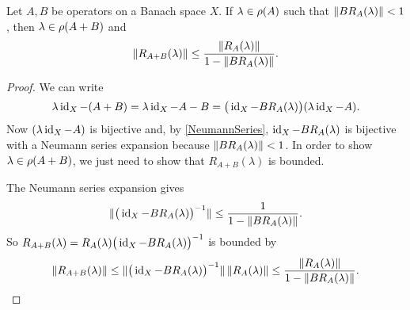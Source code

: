 \begin{lemma} \label{perturbationLemma}
Let $A, B$ be operators on a Banach space $X$. If $\lambda\in\rho(A)$ such that $\lVert BR_A(\lambda)\rVert < 1$, then $\lambda\in \rho(A+B)$ and
\[ \lVert R_{A+B}(\lambda)\rVert \leq \frac{\lVert R_A(\lambda)\rVert}{1- \lVert BR_A(\lambda)\rVert}. \]
\end{lemma}
\begin{proof}
We can write
\[ \lambda\operatorname{id}_X - (A+B) = \lambda\operatorname{id}_X - A-B = \big(\operatorname{id}_X - BR_A(\lambda)\big)(\lambda\operatorname{id}_X - A). \]
Now $(\lambda\operatorname{id}_X - A)$ is bijective and, by \ref{NeumannSeries}, $\operatorname{id}_X - BR_A(\lambda)$ is bijective with a Neumann series expansion because $\lVert BR_A(\lambda)\rVert < 1$. In order to show $\lambda\in\rho(A+B)$, we just need to show that $R_{A+B}(\lambda)$ is bounded.

The Neumann series expansion gives
\[ \lVert\big(\operatorname{id}_X - BR_A(\lambda)\big)^{-1}\rVert \leq \frac{1}{1-\lVert BR_A(\lambda)\rVert}. \]
So $R_{A+B}(\lambda) = R_A(\lambda)\big(\operatorname{id}_X - BR_A(\lambda)\big)^{-1}$ is bounded by
\[ \lVert R_{A+B}(\lambda)\rVert \leq \lVert\big(\operatorname{id}_X - BR_A(\lambda)\big)^{-1}\rVert\,\lVert R_A(\lambda)\rVert \leq \frac{\lVert R_A(\lambda)\rVert}{1-\lVert BR_A(\lambda)\rVert}. \]
\end{proof}


